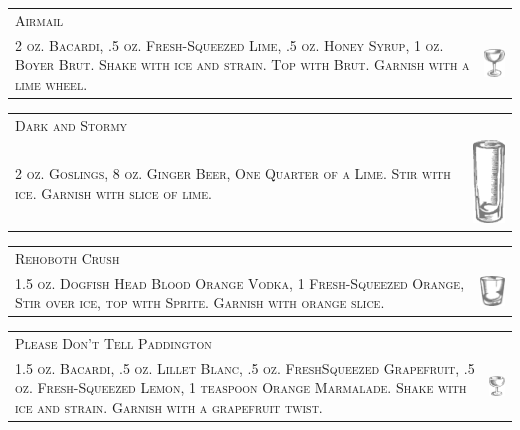 \documentclass{article}
\begin{document}
\begin{tabular}{b{2.5in} m{0.625in}}
  \multicolumn{2}{p{3.0in}}{\centering\Huge\textsc{Airmail}} \\ 
  
  \textsc{2 oz. Bacardi, .5 oz. Fresh-Squeezed Lime, .5 oz. Honey
    Syrup, 1 oz. Boyer Brut. Shake with ice and strain. Top with
    Brut. Garnish with a lime wheel.} &
  \includegraphics[width=0.5in]{egg_coupe.png}
\end{tabular}

\begin{tabular}{b{2.5in} m{0.625in}}
  \multicolumn{2}{p{3.0in}}{\centering\Huge\textsc{Dark and Stormy}} \\ 
  
  \textsc{2 oz. Goslings, 8 oz. Ginger Beer, One Quarter of a
    Lime. Stir with ice. Garnish with slice of lime.} &
  \includegraphics[width=0.5in]{collins.png}
\end{tabular}

\begin{tabular}{b{2.5in} m{0.625in}}
  \multicolumn{2}{p{3.0in}}{\centering\Huge\textsc{Rehoboth Crush}} \\ 
  
  \textsc{1.5 oz. Dogfish Head Blood Orange Vodka, 1 Fresh-Squeezed
    Orange, Stir over ice, top with Sprite. Garnish with orange
    slice.} & \includegraphics[width=0.5in]{rocks_glass.png}
\end{tabular}

\begin{tabular}{b{2.5in} m{0.625in}}
  \multicolumn{2}{p{3.0in}}{\centering\Huge\textsc{Please Don't Tell Paddington}} \\ 
  
  \textsc{1.5 oz. Bacardi, .5 oz. Lillet Blanc, .5 oz. FreshSqueezed
    Grapefruit, .5 oz. Fresh-Squeezed Lemon, 1 teaspoon Orange
    Marmalade. Shake with ice and strain. Garnish with a grapefruit
    twist.} & \includegraphics[width=0.5in]{coupe.png}
\end{tabular}
\end{document}

